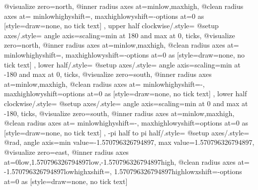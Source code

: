 {{{      @visualize zero=north,
      @inner radius axes at={{min}{low},{max}{high}},
      @clean radius axes at={%
        {min}{low}{high}{yshift=}{},%
        {max}{high}{low}{yshift=-}{options at=0 as
          [{style={draw=none}, no tick text}]}
      }
    }
  },
  upper half clockwise/.style={
    @setup axes/.style={
      angle axis={scaling=min at 180 and max at 0, ticks},
      @visualize zero=north,
      @inner radius axes at={{min}{low},{max}{high}},
      @clean radius axes at={%
        {min}{low}{high}{yshift=}{},%
        {max}{high}{low}{yshift=-}{options at=0 as
          [{style={draw=none}, no tick text}]}
      }
    }
  },
  lower half/.style={
    @setup axes/.style={
      angle axis={scaling=min at -180 and max at 0, ticks},
      @visualize zero=south,
      @inner radius axes at={{min}{low},{max}{high}},
      @clean radius axes at={%
        {min}{low}{high}{yshift=-}{},%
        {max}{high}{low}{yshift=}{options at=0 as
          [{style={draw=none}, no tick text}]}
      }
    }
  },
  lower half clockwise/.style={
    @setup axes/.style={
      angle axis={scaling=min at 0 and max at -180, ticks},
      @visualize zero=south,
      @inner radius axes at={{min}{low},{max}{high}},
      @clean radius axes at={%
        {min}{low}{high}{yshift=-}{},%
        {max}{high}{low}{yshift=}{options at=0 as
          [{style={draw=none}, no tick text}]}
      }
    }
  },
  -pi half to pi half/.style={
    @setup axes/.style={
      @rad,
      angle axis={min value=-1.570796326794897, max value=1.570796326794897},
      @visualize zero=east,
      @inner radius axes at={{0}{low},{1.570796326794897}{low},{-1.570796326794897}{high}},
      @clean radius axes at={%
        {-1.570796326794897}{low}{high}{xshift=}{},%
        {1.570796326794897}{high}{low}{xshift=-}{options at=0 as
          [{style={draw=none}, no tick text}]}
}}}}
